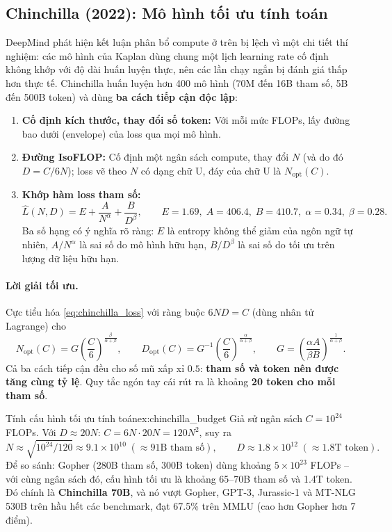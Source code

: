 \subsection{Chinchilla (2022): Mô hình tối ưu tính toán}
\label{ssec:chinchilla}
DeepMind \cite{hoffmann2022chinchilla} phát hiện kết luận phân bổ compute ở trên bị lệch vì một chi tiết thí nghiệm: các mô hình của Kaplan dùng chung một lịch learning rate cố định không khớp với độ dài huấn luyện thực, nên các lần chạy ngắn bị đánh giá thấp hơn thực tế. Chinchilla huấn luyện hơn 400 mô hình (70M đến 16B tham số, 5B đến 500B token) và dùng \textbf{ba cách tiếp cận độc lập}:
\begin{enumerate}
	\item \textbf{Cố định kích thước, thay đổi số token:} Với mỗi mức FLOPs, lấy đường bao dưới (envelope) của loss qua mọi mô hình.
	\item \textbf{Đường IsoFLOP:} Cố định một ngân sách compute, thay đổi $N$ (và do đó $D = C/6N$); loss vẽ theo $N$ có dạng chữ U, đáy của chữ U là $N_{\text{opt}}(C)$.
	\item \textbf{Khớp hàm loss tham số:}
	\begin{equation}
		\hat{L}(N, D) = E + \frac{A}{N^{\alpha}} + \frac{B}{D^{\beta}}, \qquad E = 1.69,\; A = 406.4,\; B = 410.7,\; \alpha = 0.34,\; \beta = 0.28.
		\label{eq:chinchilla_loss}
	\end{equation}
	Ba số hạng có ý nghĩa rõ ràng: $E$ là entropy không thể giảm của ngôn ngữ tự nhiên, $A/N^\alpha$ là sai số do mô hình hữu hạn, $B/D^\beta$ là sai số do tối ưu trên lượng dữ liệu hữu hạn.
\end{enumerate}

\paragraph{Lời giải tối ưu.} Cực tiểu hóa \eqref{eq:chinchilla_loss} với ràng buộc $6ND = C$ (dùng nhân tử Lagrange) cho
\[
N_{\text{opt}}(C) = G\left(\frac{C}{6}\right)^{\frac{\beta}{\alpha+\beta}}, \qquad
D_{\text{opt}}(C) = G^{-1}\left(\frac{C}{6}\right)^{\frac{\alpha}{\alpha+\beta}}, \qquad
G = \left(\frac{\alpha A}{\beta B}\right)^{\frac{1}{\alpha+\beta}}.
\]
Cả ba cách tiếp cận đều cho số mũ xấp xỉ $0.5$: \textbf{tham số và token nên được tăng cùng tỷ lệ}. Quy tắc ngón tay cái rút ra là khoảng \textbf{20 token cho mỗi tham số}.

\begin{example}{Tính cấu hình tối ưu tính toán}{ex:chinchilla_budget}
Giả sử ngân sách $C = 10^{24}$ FLOPs. Với $D \approx 20N$: $C = 6N \cdot 20N = 120N^2$, suy ra
\[
N \approx \sqrt{10^{24}/120} \approx 9.1 \times 10^{10} \;(\approx 91\text{B tham số}), \qquad D \approx 1.8 \times 10^{12} \;(\approx 1.8\text{T token}).
\]
Để so sánh: Gopher (280B tham số, 300B token) dùng khoảng $5 \times 10^{23}$ FLOPs -- với cùng ngân sách đó, cấu hình tối ưu là khoảng 65--70B tham số và 1.4T token. Đó chính là \textbf{Chinchilla 70B}, và nó vượt Gopher, GPT-3, Jurassic-1 và MT-NLG 530B trên hầu hết các benchmark, đạt 67.5\% trên MMLU (cao hơn Gopher hơn 7 điểm).
\end{example}

